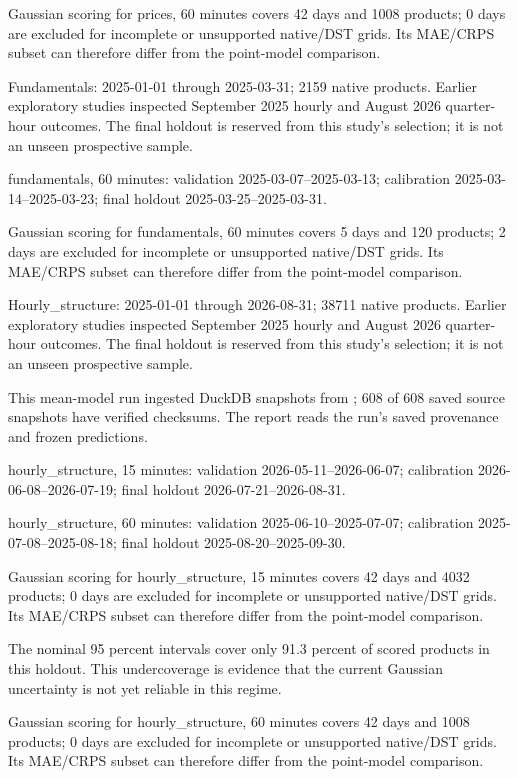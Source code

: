 \documentclass[11pt,a4paper]{article}
\begin{document}
Gaussian scoring for prices, 60 minutes covers 42 days and 1008 products; 0 days are excluded for incomplete or unsupported native/DST grids. Its MAE/CRPS subset can therefore differ from the point-model comparison.

Fundamentals: 2025-01-01 through 2025-03-31; 2159 native products. Earlier exploratory studies inspected September 2025 hourly and August 2026 quarter-hour outcomes. The final holdout is reserved from this study's selection; it is not an unseen prospective sample.

fundamentals, 60 minutes: validation 2025-03-07--2025-03-13; calibration 2025-03-14--2025-03-23; final holdout 2025-03-25--2025-03-31.

Gaussian scoring for fundamentals, 60 minutes covers 5 days and 120 products; 2 days are excluded for incomplete or unsupported native/DST grids. Its MAE/CRPS subset can therefore differ from the point-model comparison.

Hourly\_structure: 2025-01-01 through 2026-08-31; 38711 native products. Earlier exploratory studies inspected September 2025 hourly and August 2026 quarter-hour outcomes. The final holdout is reserved from this study's selection; it is not an unseen prospective sample.

This mean-model run ingested DuckDB snapshots from ; 608 of 608 saved source snapshots have verified checksums. The report reads the run's saved provenance and frozen predictions.

hourly\_structure, 15 minutes: validation 2026-05-11--2026-06-07; calibration 2026-06-08--2026-07-19; final holdout 2026-07-21--2026-08-31.

hourly\_structure, 60 minutes: validation 2025-06-10--2025-07-07; calibration 2025-07-08--2025-08-18; final holdout 2025-08-20--2025-09-30.

Gaussian scoring for hourly\_structure, 15 minutes covers 42 days and 4032 products; 0 days are excluded for incomplete or unsupported native/DST grids. Its MAE/CRPS subset can therefore differ from the point-model comparison.

The nominal 95 percent intervals cover only 91.3 percent of scored products in this holdout. This undercoverage is evidence that the current Gaussian uncertainty is not yet reliable in this regime.

Gaussian scoring for hourly\_structure, 60 minutes covers 42 days and 1008 products; 0 days are excluded for incomplete or unsupported native/DST grids. Its MAE/CRPS subset can therefore differ from the point-model comparison.
\end{document}
